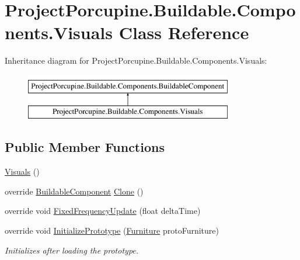 \hypertarget{class_project_porcupine_1_1_buildable_1_1_components_1_1_visuals}{}\section{Project\+Porcupine.\+Buildable.\+Components.\+Visuals Class Reference}
\label{class_project_porcupine_1_1_buildable_1_1_components_1_1_visuals}
Inheritance diagram for Project\+Porcupine.\+Buildable.\+Components.\+Visuals\+:\begin{figure}[H]
\begin{center}
\leavevmode
\includegraphics[height=2.000000cm]{class_project_porcupine_1_1_buildable_1_1_components_1_1_visuals}
\end{center}
\end{figure}
\subsection*{Public Member Functions}
\begin{DoxyCompactItemize}
\item 
\hyperlink{class_project_porcupine_1_1_buildable_1_1_components_1_1_visuals_a3bd18e0eeea98833e21986e4c37510cc}{Visuals} ()
\item 
override \hyperlink{class_project_porcupine_1_1_buildable_1_1_components_1_1_buildable_component}{Buildable\+Component} \hyperlink{class_project_porcupine_1_1_buildable_1_1_components_1_1_visuals_aa52dbb79a4a4f72b83c7a117080700d9}{Clone} ()
\item 
override void \hyperlink{class_project_porcupine_1_1_buildable_1_1_components_1_1_visuals_a3650e3d2ff6aef61090eeaf900f9a041}{Fixed\+Frequency\+Update} (float delta\+Time)
\item 
override void \hyperlink{class_project_porcupine_1_1_buildable_1_1_components_1_1_visuals_a0b0f9d1cf4d32880d051897bc0789732}{Initialize\+Prototype} (\hyperlink{class_furniture}{Furniture} proto\+Furniture)
\begin{DoxyCompactList}\small\item\em Initializes after loading the prototype. \end{DoxyCompactList}\end{DoxyCompactItemize}
